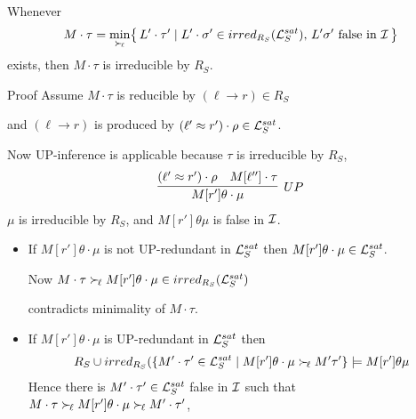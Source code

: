 \documentclass[%
handout,
]{beamer}
\begin{document}
\begin{frame}[allowframebreaks]
    \begin{lemma}\label{irreducible}
        Whenever
        \begin{gather*}
            M\cdot\tau = \min_{\mathrel\succ_{\!\ell}}\!
            \left\{\,
            L'\cdot\tau' \mid
            L'\cdot\sigma' \in irred_{R_S}(\mathcal{L}_S^{sat}),\,
            L'\sigma'\text{ false in }\mathcal{I}\,
            \right\}
        \end{gather*}
        exists, then $M\cdot\tau$ is irreducible by $R_S$.
    \end{lemma}

    \begin{block}{Proof}
        Assume $M\cdot\tau$ is reducible by $(\ell\to r)\in R_S$

        and $(\ell\to r)$ is produced by $(\ell'\approx r')\cdot\rho\in\mathcal{L}_S^{sat}$.

        \vspace{0.7em}
        Now UP-inference is applicable because $\tau$ is irreducible by $R_S$,
        \begin{gather*}
            \infer[UP]
            {M[r']\theta\cdot\mu}
            {(\ell'\mEQ r')\cdot\rho & M[\ell'']\cdot\tau}
        \end{gather*}
        $\mu$ is irreducible by $R_S$, and $M[r']\theta\mu${ is false in }$\mathcal{I}$.
    \end{block}



        \begin{itemize}
            \item If $M[r']\theta\cdot\mu$ is not UP-redundant in $\mathcal{L}_S^{sat}$
            then $M[r']\theta\cdot\mu\in\mathcal{L}_S^{sat}$.

            \vspace{0.7em}
            Now $M\cdot\tau\mathrel\succ_{\!\ell}
            M[r']\theta\cdot\mu\in irred_{R_S}(\mathcal{L}_S^{sat})$ 

            contradicts minimality of $M\cdot\tau$.


            \vspace{0.7em}
            \item If $M[r']\theta\cdot\mu$ is UP-redundant in $\mathcal{L}_S^{sat}$ then
            \begin{gather*}
                R_S \cup irred_{R_S}(
                \{
                    M'\cdot\tau'\in\mathcal{L}_S^{sat}\mid
                    M[r']\theta\cdot\mu \mathrel\succ_{\!\ell} M'\tau'
                    \} \models M[r']\theta\mu
            \end{gather*}
            Hence there is $M'\cdot\tau'\in\mathcal{L}_S^{sat}$ false in $\mathcal{I}$ such that
            $M\cdot\tau\mathrel\succ_{\!\ell} M[r']\theta\cdot\mu\mathrel\succ_{\!\ell} M'\cdot\tau'$,


\end{itemize}
\end{frame}
\end{document}
